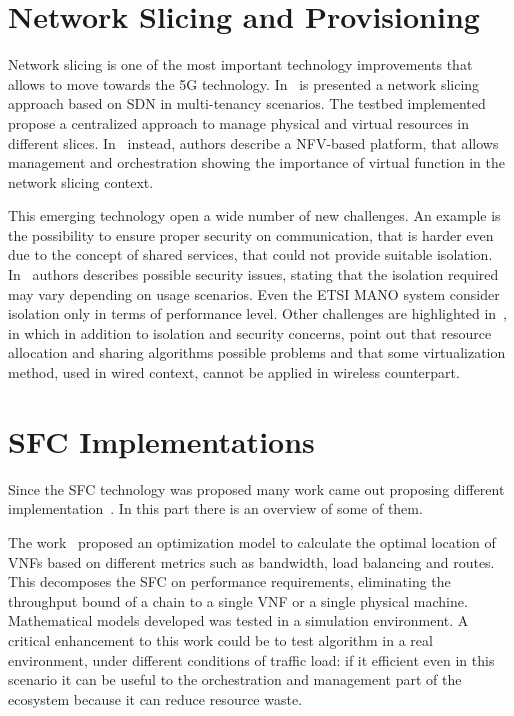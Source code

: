 \section{Network Slicing and Provisioning}
Network slicing is one of the most important technology improvements that allows
to move towards the 5G technology. In~\cite{chartsias2017sdn} is presented a
network slicing approach based on SDN in multi-tenancy scenarios. The testbed
implemented propose a centralized approach to manage physical and virtual
resources in different slices. In~\cite{peuster2016medicine} instead, authors
describe a NFV-based platform, that allows management and orchestration showing
the importance of virtual function in the network slicing context.

This emerging technology open a wide number of new challenges. An example is the
possibility to ensure proper security on communication, that is harder even due
to the concept of shared services, that could not provide suitable isolation. 
In~\cite{kotulski2017end} authors describes possible security issues, stating
that the isolation required may vary depending on usage scenarios. Even the ETSI
MANO system consider isolation only in terms of performance level. Other
challenges are highlighted in~\cite{li2017network}, in which in addition to
isolation and security concerns, point out that resource allocation and
sharing algorithms possible problems and that some virtualization method, used
in wired context, cannot be applied in wireless counterpart.

\section{SFC Implementations}

Since the SFC technology was proposed many work came out proposing different
implementation~\cite{medhat2017service}. In this part there is an overview of
some of them.

The work~\cite{GhaznaviSAB16} proposed an optimization model to calculate the
optimal location of VNFs based on different metrics such as bandwidth, load
balancing and routes. This decomposes the SFC on performance requirements,
eliminating the throughput bound of a chain to a single VNF or a single physical
machine. Mathematical models developed was tested in a simulation environment. A
critical enhancement to this work could be to test algorithm in a real
environment, under different conditions of traffic load: if it efficient even in
this scenario it can be useful to the orchestration and management part of the
ecosystem because it can reduce resource waste.

